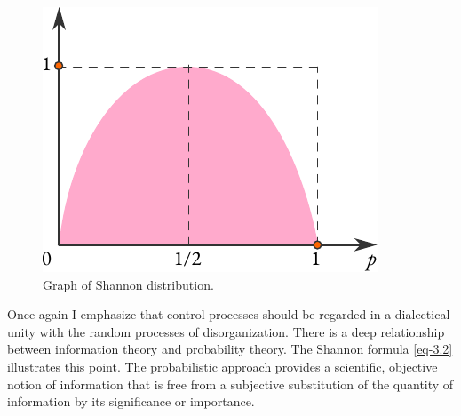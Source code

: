 \begin{figure}%
 \centering
 \includegraphics[width=\linewidth]{figures/shannon-distro.pdf}
\caption{Graph of Shannon distribution.\label{shannon-distro}}
 \end{figure}


Once again I emphasize that control processes should be regarded in
a dialectical unity with the random processes of disorganization. There
is a deep relationship between information theory and probability
theory. The Shannon formula \eqref{eq-3.2} illustrates this point. The
probabilistic approach provides a scientific, objective notion of
information that is free from a subjective substitution of the quantity of
information by its significance or importance.



